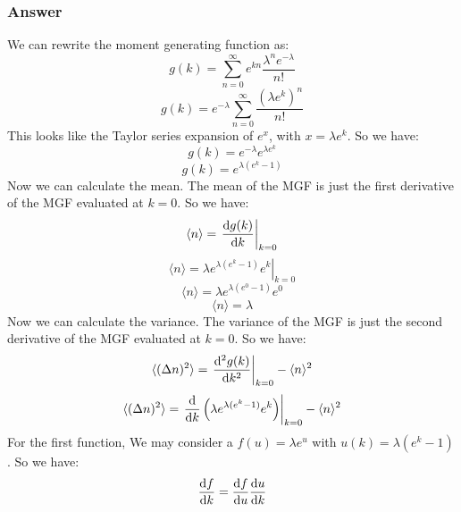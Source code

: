 \documentclass{article}
\begin{document}
\subsubsection{Answer}
We can rewrite the moment generating function as:
\begin{equation}
    g(k) = \sum_{n=0}^{\infty} e^{kn} \frac{\lambda^n e^{-\lambda}}{n!}
\end{equation}
\begin{equation}
    g(k) = e^{-\lambda} \sum_{n=0}^{\infty} \frac{(\lambda e^k)^n}{n!}
\end{equation}
This looks like the Taylor series expansion of \( e^x \), with \( x = \lambda e^k \). So we have:
\begin{equation}
    g(k) = e^{-\lambda} e^{\lambda e^k}
\end{equation}
\begin{equation}
\boxed{g(k) = e^{\lambda (e^k - 1)}}
\end{equation}
Now we can calculate the mean. The mean of the MGF is just the first derivative of the MGF evaluated at \( k = 0 \). So we have:
\begin{equation}
    \langle n \rangle = \left. \dv{g(k)}{k} \right|_{k=0}
\end{equation}
\begin{equation}
    \langle n \rangle = \left. \lambda e^{\lambda (e^k - 1)} e^k \right|_{k=0}
\end{equation}
\begin{equation}
    \langle n \rangle = \lambda e^{\lambda (e^0 - 1)} e^0
\end{equation}
\begin{equation}
    \boxed{\langle n \rangle = \lambda}
\end{equation}
Now we can calculate the variance. The variance of the MGF is just the second derivative of the MGF evaluated at \( k = 0 \). So we have:
\begin{equation}
    \langle (\Delta n)^2 \rangle = \left. \dv[2]{g(k)}{k} \right|_{k=0} - \langle n \rangle^2
\end{equation}
\begin{equation}
    \langle (\Delta n)^2 \rangle = \left. \dv{k} \left( \lambda e^{\lambda (e^k - 1)} e^k \right) \right|_{k=0} - \langle n \rangle^2
\end{equation}
For the first function, We may consider a $f(u) = \lambda e^u$ with $u(k) = \lambda (e^k - 1)$. So we have:
\begin{equation}
    \dv{f}{k} = \dv{f}{u} \dv{u}{k}
\end{equation}
\end{document}
